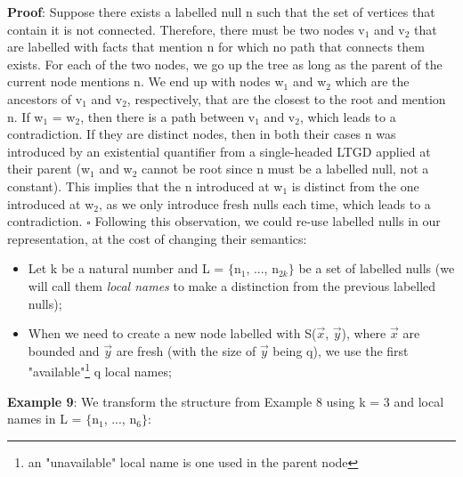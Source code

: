 \documentclass[11pt, a4paper, dvipsnames]{article}
\begin{document}
\textbf{Proof}: Suppose there exists a labelled null n such that the set of vertices that contain it is not connected. Therefore, there must be two nodes v$_{1}$ and v$_{2}$ that are labelled with facts that mention n for which no path that connects them exists. For each of the two nodes, we go up the tree as long as the parent of the current node mentions n. We end up with nodes w$_{1}$ and w$_{2}$ which are the ancestors of v$_{1}$ and v$_{2}$, respectively, that are the closest to the root and mention n. If w$_{1}$ = w$_{2}$, then there is a path between v$_{1}$ and v$_{2}$, which leads to a contradiction. If they are distinct nodes, then in both their cases n was introduced by an existential quantifier from a single-headed LTGD applied at their parent (w$_{1}$ and w$_{2}$ cannot be root since n must be a labelled null, not a constant). This implies that the n introduced at w$_{1}$ is distinct from the one introduced at w$_{2}$, as we only introduce fresh nulls each time, which leads to a contradiction.  $\square$\newline
Following this observation, we could re-use labelled nulls in our representation, at the cost of changing their semantics:
\begin{itemize}
	\item Let k be a natural number and L = $\{$n$_{1}$, ..., n$_{2k}\}$ be a set of labelled nulls (we will call them \textit{local names} to make a distinction from the previous labelled nulls);
	\item When we need to create a new node labelled with S($\vec{x}$, $\vec{y}$), where $\vec{x}$ are bounded and $\vec{y}$ are fresh (with the size of $\vec{y}$ being q), we use the first "available"\footnote{an "unavailable" local name is one used in the parent node} q local names; 
\end{itemize} 
\textbf{Example 9}: We transform the structure from Example 8 using k = 3 and local names in L = $\{$n$_{1}$, ..., n$_{6}\}$:
\begin{center}
\end{center}
\end{document}
